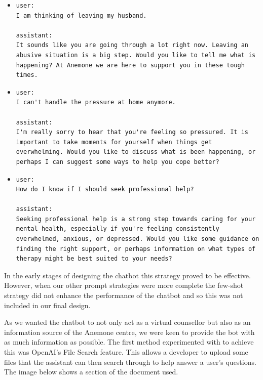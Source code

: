 \begin{itemize}
	\item 
	\begin{lstlisting}
user: 
I am thinking of leaving my husband.

assistant: 
It sounds like you are going through a lot right now. Leaving an abusive situation is a big step. Would you like to tell me what is happening? At Anemone we are here to support you in these tough times.
	\end{lstlisting}
	\item
	\begin{lstlisting}
user: 
I can't handle the pressure at home anymore.

assistant: 
I'm really sorry to hear that you're feeling so pressured. It is important to take moments for yourself when things get overwhelming. Would you like to discuss what is been happening, or perhaps I can suggest some ways to help you cope better?
	\end{lstlisting}
    \item
	\begin{lstlisting}
user: 
How do I know if I should seek professional help?
        
assistant: 
Seeking professional help is a strong step towards caring for your mental health, especially if you're feeling consistently overwhelmed, anxious, or depressed. Would you like some guidance on finding the right support, or perhaps information on what types of therapy might be best suited to your needs?
\end{lstlisting}

\end{itemize}

In the early stages of designing the chatbot this strategy proved to be effective. However, when our other prompt strategies were more complete the few-shot strategy did not enhance the performance of the chatbot and so this was not included in our final design. 

As we wanted the chatbot to not only act as a virtual counsellor but also as an information source of the Anemone centre, we were keen to provide the bot with as much information as possible.
The first method experimented with to achieve this was OpenAI's File Search feature. This allows a developer to upload some files that the assistant can then search through to help answer a user's questions. 
The image below shows a section of the document used. 

